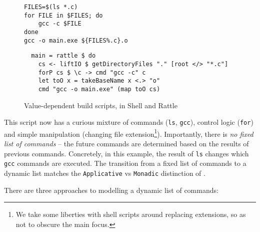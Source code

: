 \vspace{3mm}
\begin{figure}[h!]
\begin{minipage}{.35\textwidth}
  \begin{small}
\begin{verbatim}
FILES=$(ls *.c)
for FILE in $FILES; do
    gcc -c $FILE
done
gcc -o main.exe ${FILES%.c}.o
\end{verbatim}
  \end{small}
\end{minipage}%
\begin{minipage}{.65\textwidth}
  \begin{small}
\begin{verbatim}
  main = rattle $ do
    cs <- liftIO $ getDirectoryFiles "." [root </> "*.c"]
    forP cs $ \c -> cmd "gcc -c" c
    let toO x = takeBaseName x <.> "o"
    cmd "gcc -o main.exe" (map toO cs)
\end{verbatim}
\end{small}
\end{minipage}

  \caption{Value-dependent build scripts, in Shell and Rattle}
  \label{fig:getdir}
\end{figure}

This script now has a curious mixture of commands (\texttt{ls}, \texttt{gcc}), control logic (\texttt{for}) and simple manipulation (changing file extension\footnote{We take some liberties with shell scripts around replacing extensions, so as not to obscure the main focus.}). Importantly, there is \emph{no fixed list of commands} -- the future commands are determined based on the results of previous commands. Concretely, in this example, the result of \texttt{ls} changes which \texttt{gcc} commands are executed. The transition from a fixed list of commands to a dynamic list matches the \texttt{Applicative} vs \texttt{Monadic} distinction of \citet[\S3.5]{build_systems_a_la_carte}.

There are three approaches to modelling a dynamic list of commands:


